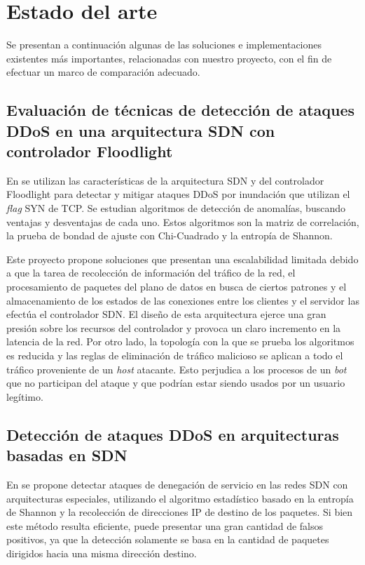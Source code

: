 \begin{enumerate}
\end{enumerate}


\section{Estado del arte} \label{sec:state_art}
Se presentan a continuación algunas de las soluciones e implementaciones
existentes más importantes, relacionadas con nuestro proyecto, con el fin de
efectuar un marco de comparación adecuado.

\subsection*{Evaluación de técnicas de detección de ataques DDoS en una
arquitectura SDN con controlador Floodlight}
En \parencite{estado_arte_1} se utilizan las características de la arquitectura
SDN y del controlador Floodlight para detectar y mitigar ataques DDoS por
inundación que utilizan el \textit{flag} SYN de TCP. Se estudian  algoritmos de
detección de anomalías, buscando ventajas y desventajas de cada uno. Estos
algoritmos son la matriz de correlación, la prueba de bondad de ajuste con
Chi-Cuadrado y la entropía de Shannon. 

Este proyecto \parencite{estado_arte_1} propone soluciones que presentan una
escalabilidad limitada debido a que la tarea de recolección de información del
tráfico de la red, el procesamiento de paquetes del plano de datos en busca de
ciertos patrones y el almacenamiento de los estados de las conexiones entre los
clientes y el servidor las efectúa el controlador SDN. El diseño de esta
arquitectura ejerce una gran presión sobre los recursos del controlador y
provoca un claro incremento en la latencia de la red. Por otro lado, la
topología con la que se prueba los algoritmos es reducida y las reglas de
eliminación de tráfico malicioso se aplican a todo el tráfico proveniente de un
\textit{host} atacante. Esto perjudica a los procesos de un \textit{bot} que no
participan del ataque y que podrían estar siendo usados por un usuario legítimo.


\subsection*{Detección de ataques DDoS en arquitecturas basadas en SDN}
En \parencite{estado_arte_2} se propone detectar ataques de denegación de servicio en las redes SDN con arquitecturas especiales, utilizando el algoritmo estadístico basado en la entropía de Shannon y la recolección de direcciones IP de destino de los paquetes. Si bien este método resulta eficiente, puede presentar una gran cantidad de falsos positivos, ya que la detección solamente se basa en la cantidad de paquetes dirigidos hacia una misma dirección destino.

